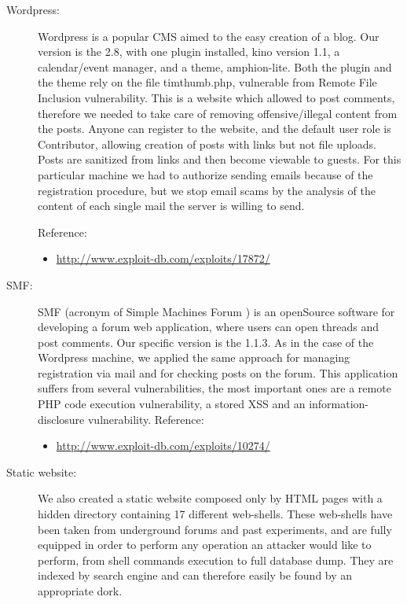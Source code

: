 \begin{description}
\item[Wordpress: ] Wordpress \cite{wordpress} is a popular CMS aimed to the easy creation of a blog. Our version is the 2.8, with one plugin installed, kino version 1.1, a calendar/event manager, and a theme, amphion-lite. Both the plugin and the theme rely on the file timthumb.php, vulnerable from Remote File Inclusion vulnerability. This is a website which allowed to post comments, therefore we needed to take care of removing offensive/illegal content from the posts. Anyone can register to the website, and the default user role is Contributor, allowing creation of posts with links but not file uploads. Posts are sanitized from links and then become viewable to guests. For this particular machine we had to authorize sending emails because of the registration procedure, but we stop email scams by the analysis of the content of each single mail the server is willing to send.

Reference:
\begin{itemize}
\item
\url{http://www.exploit-db.com/exploits/17872/}
\end{itemize}

\item[SMF: ] SMF (acronym of Simple Machines Forum \cite{smf}) is an openSource software for developing a forum web application, where users can open threads and post comments. Our specific version is the 1.1.3. As in the case of the Wordpress machine, we applied the same approach for managing registration via mail and for checking posts on the forum. This application suffers from several vulnerabilities, the most important ones are a remote PHP code execution vulnerability, a stored XSS and an information-disclosure vulnerability.
Reference:
\begin{itemize}
\item
\url{http://www.exploit-db.com/exploits/10274/}
\end{itemize}

\item[Static website: ] We also created a static website composed only by HTML pages with a hidden directory containing 17 different web-shells. These web-shells have been taken from underground forums and past experiments, and are fully equipped in order to perform any operation an attacker would like to perform, from shell commands execution to full database dump. They are indexed by search engine and can therefore easily be found by an appropriate dork.


\end{description}

